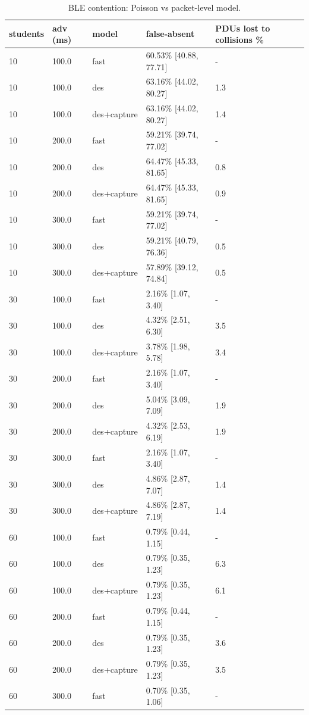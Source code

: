 \begin{table}[t]
\centering
\caption{BLE contention: Poisson vs packet-level model.}\label{tab:e07}
\begin{tabular}{lllll}
\toprule
students & adv (ms) & model & false-absent & PDUs lost to collisions \% \\
\midrule
10 & 100.0 & fast & 60.53\% [40.88, 77.71] & - \\
10 & 100.0 & des & 63.16\% [44.02, 80.27] & 1.3 \\
10 & 100.0 & des+capture & 63.16\% [44.02, 80.27] & 1.4 \\
10 & 200.0 & fast & 59.21\% [39.74, 77.02] & - \\
10 & 200.0 & des & 64.47\% [45.33, 81.65] & 0.8 \\
10 & 200.0 & des+capture & 64.47\% [45.33, 81.65] & 0.9 \\
10 & 300.0 & fast & 59.21\% [39.74, 77.02] & - \\
10 & 300.0 & des & 59.21\% [40.79, 76.36] & 0.5 \\
10 & 300.0 & des+capture & 57.89\% [39.12, 74.84] & 0.5 \\
30 & 100.0 & fast & 2.16\% [1.07, 3.40] & - \\
30 & 100.0 & des & 4.32\% [2.51, 6.30] & 3.5 \\
30 & 100.0 & des+capture & 3.78\% [1.98, 5.78] & 3.4 \\
30 & 200.0 & fast & 2.16\% [1.07, 3.40] & - \\
30 & 200.0 & des & 5.04\% [3.09, 7.09] & 1.9 \\
30 & 200.0 & des+capture & 4.32\% [2.53, 6.19] & 1.9 \\
30 & 300.0 & fast & 2.16\% [1.07, 3.40] & - \\
30 & 300.0 & des & 4.86\% [2.87, 7.07] & 1.4 \\
30 & 300.0 & des+capture & 4.86\% [2.87, 7.19] & 1.4 \\
60 & 100.0 & fast & 0.79\% [0.44, 1.15] & - \\
60 & 100.0 & des & 0.79\% [0.35, 1.23] & 6.3 \\
60 & 100.0 & des+capture & 0.79\% [0.35, 1.23] & 6.1 \\
60 & 200.0 & fast & 0.79\% [0.44, 1.15] & - \\
60 & 200.0 & des & 0.79\% [0.35, 1.23] & 3.6 \\
60 & 200.0 & des+capture & 0.79\% [0.35, 1.23] & 3.5 \\
60 & 300.0 & fast & 0.70\% [0.35, 1.06] & - \\

\end{tabular}
\end{table}
